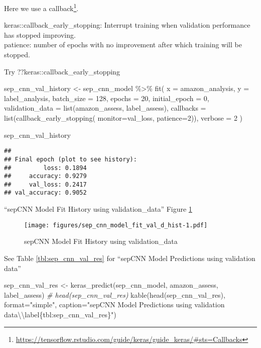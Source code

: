 \documentclass[
]{article}
\newenvironment{Shaded}{}{}
\newcommand{\AttributeTok}[1]{\textcolor[rgb]{0.49,0.56,0.16}{#1}}
\newcommand{\CommentTok}[1]{\textcolor[rgb]{0.38,0.63,0.69}{\textit{#1}}}
\newcommand{\DecValTok}[1]{\textcolor[rgb]{0.25,0.63,0.44}{#1}}
\newcommand{\FunctionTok}[1]{\textcolor[rgb]{0.02,0.16,0.49}{#1}}
\newcommand{\NormalTok}[1]{#1}
\newcommand{\OtherTok}[1]{\textcolor[rgb]{0.00,0.44,0.13}{#1}}
\newcommand{\SpecialCharTok}[1]{\textcolor[rgb]{0.25,0.44,0.63}{#1}}
\newcommand{\StringTok}[1]{\textcolor[rgb]{0.25,0.44,0.63}{#1}}
\DeclareRobustCommand{\href}[2]{#2\footnote{\url{#1}}}
\begin{document}
Here we use a
\href{https://tensorflow.rstudio.com/guide/keras/guide_keras/\#sts=Callbacks}{callback}.

keras::callback\_early\_stopping: Interrupt training when validation
performance has stopped improving.\\
patience: number of epochs with no improvement after which training will
be stopped.

Try ??keras::callback\_early\_stopping

\begin{Shaded}
\begin{Highlighting}[]
\NormalTok{sep\_cnn\_val\_history }\OtherTok{\textless{}{-}}\NormalTok{ sep\_cnn\_model }\SpecialCharTok{\%\textgreater{}\%}
  \FunctionTok{fit}\NormalTok{(}
    \AttributeTok{x =}\NormalTok{ amazon\_analysis,}
    \AttributeTok{y =}\NormalTok{ label\_analysis,}
    \AttributeTok{batch\_size =} \DecValTok{128}\NormalTok{,}
    \AttributeTok{epochs =} \DecValTok{20}\NormalTok{,}
    \AttributeTok{initial\_epoch =} \DecValTok{0}\NormalTok{,}
    \AttributeTok{validation\_data =} \FunctionTok{list}\NormalTok{(amazon\_assess, label\_assess),}
    \AttributeTok{callbacks =} \FunctionTok{list}\NormalTok{(}\FunctionTok{callback\_early\_stopping}\NormalTok{(}
        \AttributeTok{monitor=}\StringTok{\textquotesingle{}val\_loss\textquotesingle{}}\NormalTok{, }\AttributeTok{patience=}\DecValTok{2}\NormalTok{)),}
    \AttributeTok{verbose =} \DecValTok{2}
\NormalTok{  )}

\NormalTok{sep\_cnn\_val\_history}
\end{Highlighting}
\end{Shaded}

\begin{verbatim}
## 
## Final epoch (plot to see history):
##         loss: 0.1894
##     accuracy: 0.9279
##     val_loss: 0.2417
## val_accuracy: 0.9052
\end{verbatim}

``sepCNN Model Fit History using validation\_data'' Figure
\ref{fig:model_17}

\begin{figure}
\centering
\texttt{[image: figures/sep\_cnn\_model\_fit\_val\_d\_hist-1.pdf]}
\caption{sepCNN Model Fit History using
validation\_data\label{fig:model_17}}
\end{figure}

See Table \ref{tbl:sep_cnn_val_res} for ``sepCNN Model Predictions using
validation data''

\begin{Shaded}
\begin{Highlighting}[]
\NormalTok{sep\_cnn\_val\_res }\OtherTok{\textless{}{-}} \FunctionTok{keras\_predict}\NormalTok{(sep\_cnn\_model, amazon\_assess, label\_assess)}
\CommentTok{\# head(sep\_cnn\_val\_res)}
\FunctionTok{kable}\NormalTok{(}\FunctionTok{head}\NormalTok{(sep\_cnn\_val\_res), }\AttributeTok{format=}\StringTok{"simple"}\NormalTok{, }\AttributeTok{caption=}\StringTok{"sepCNN Model Predictions using validation data}\SpecialCharTok{\textbackslash{}\textbackslash{}}\StringTok{label\{tbl:sep\_cnn\_val\_res\}"}\NormalTok{)}
\end{Highlighting}
\end{Shaded}
\end{document}
